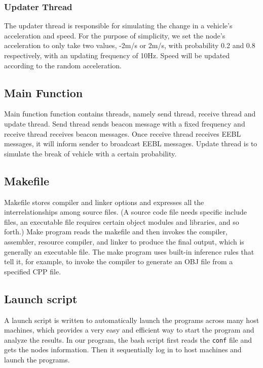 \documentclass[twocolumn]{article}
\begin{document}
\subsubsection{Updater Thread}
\label{sec:thread_updater}
\par{The updater thread is responsible for simulating the change in a vehicle’s acceleration and speed. For the purpose of simplicity, we set the node’s acceleration to only take two values, -2m/s or 2m/s, with probability 0.2 and 0.8 respectively, with an updating frequency of 10Hz. Speed will be updated according to the random acceleration.}
\subsection{Main Function}
\par{Main function function contains threads, namely send thread, receive thread and update thread. Send thread sends beacon message with a fixed frequency and receive thread receives beacon messages. Once receive thread receives EEBL messages, it will inform sender to broadcast EEBL messages. Update thread is to simulate the break of vehicle with a certain probability.}
\subsection{Makefile}
\par{Makefile stores compiler and linker options and expresses all the interrelationships among source files. (A source code file needs specific include files, an executable file requires certain object modules and libraries, and so forth.) Make program reads the makefile and then invokes the compiler, assembler, resource compiler, and linker to produce the final output, which is generally an executable file. The make program uses built-in inference rules that tell it, for example, to invoke the compiler to generate an OBJ file from a specified CPP file.}
\subsection{Launch script}
\par{A launch script is written to automatically launch the programs across many host machines, which provides a very easy and efficient way to start the program and analyze the results. In our program, the bash script first reads the {\tt conf} file and gets the nodes information. Then it sequentially log in to host machines and launch the programs. }
\label{sec:class_configuration}
\end{document}
